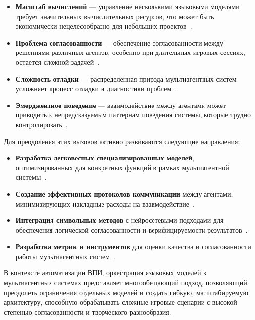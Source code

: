 \begin{itemize}
    \item \textbf{Масштаб вычислений} — управление несколькими языковыми моделями требует значительных вычислительных ресурсов, что может быть экономически нецелесообразно для небольших проектов~\cite{patterson2021carbon}.

    \item \textbf{Проблема согласованности} — обеспечение согласованности между решениями различных агентов, особенно при длительных игровых сессиях, остается сложной задачей~\cite{zhong2023memgpt}.

    \item \textbf{Сложность отладки} — распределенная природа мультиагентных систем усложняет процесс отладки и диагностики проблем~\cite{wu2023autogen}.

    \item \textbf{Эмерджентное поведение} — взаимодействие между агентами может приводить к непредсказуемым паттернам поведения системы, которые трудно контролировать~\cite{park2023generative}.
\end{itemize}

Для преодоления этих вызовов активно развиваются следующие направления:

\begin{itemize}
    \item \textbf{Разработка легковесных специализированных моделей}, оптимизированных для конкретных функций в рамках мультиагентной системы~\cite{touvron2023llama}.

    \item \textbf{Создание эффективных протоколов коммуникации} между агентами, минимизирующих накладные расходы на взаимодействие~\cite{xi2023rise}.

    \item \textbf{Интеграция символьных методов} с нейросетевыми подходами для обеспечения логической согласованности и верифицируемости результатов~\cite{karpas2022mrkl}.

    \item \textbf{Разработка метрик и инструментов} для оценки качества и согласованности работы мультиагентных систем~\cite{zheng2023building}.
\end{itemize}

В контексте автоматизации ВПИ, оркестрация языковых моделей в мультиагентных системах представляет многообещающий подход, позволяющий преодолеть ограничения отдельных моделей и создать гибкую, масштабируемую архитектуру, способную обрабатывать сложные игровые сценарии с высокой степенью согласованности и творческого разнообразия.

